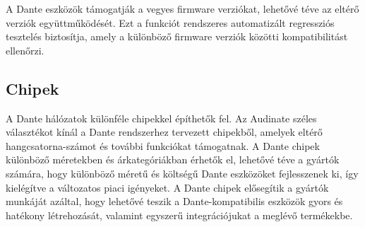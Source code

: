 A Dante eszközök támogatják a vegyes firmware verziókat, lehetővé téve az eltérő 
verziók együttműködését. Ezt a funkciót rendszeres automatizált regressziós tesztelés 
biztosítja, amely a különböző firmware verziók közötti kompatibilitást ellenőrzi.
\newpage
\subsection{Chipek}
A Dante hálózatok különféle chipekkel építhetők fel. Az Audinate széles választékot 
kínál a Dante rendszerhez tervezett chipekből, amelyek eltérő hangcsatorna-számot 
és további funkciókat támogatnak. A Dante chipek különböző méretekben és árkategóriákban 
érhetők el, lehetővé téve a gyártók számára, hogy különböző méretű és költségű Dante 
eszközöket fejlesszenek ki, így kielégítve a változatos piaci igényeket. A Dante chipek 
elősegítik a gyártók munkáját azáltal, hogy lehetővé teszik a Dante-kompatibilis eszközök 
gyors és hatékony létrehozását, valamint egyszerű integrációjukat a meglévő termékekbe.
